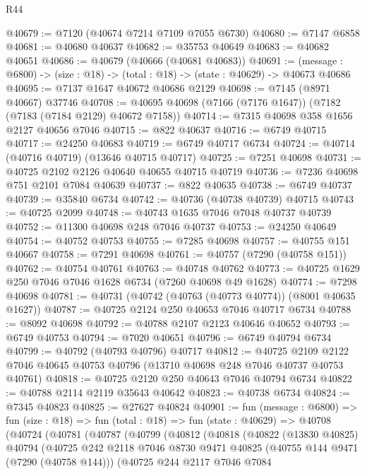 \begin{lexlean}{R44}
\begin{coremodule}
{@40679 := @7120 (@40674 @7214 @7109 @7055 @6730)
@40680 := @7147 @6858
@40681 := @40680 @40637
@40682 := @35753 @40649
@40683 := @40682 @40651
@40686 := @40679 (@40666 (@40681 @40683))
@40691 := (message : @6800) -> (size : @18) -> (total : @18) -> (state : @40629) -> @40673 @40686
@40695 := @7137 @1647 @40672 @40686 @2129
@40698 := @7145 (@8971 @40667) @37746
@40708 := @40695 @40698 (@7166 (@7176 @1647)) (@7182 (@7183 (@7184 @2129) @40672 @7158))
@40714 := @7315 @40698 @358 @1656 @2127 @40656 @7046
@40715 := @822 @40637
@40716 := @6749 @40715
@40717 := @24250 @40683
@40719 := @6749 @40717 @6734
@40724 := @40714 (@40716 @40719) (@13646 @40715 @40717)
@40725 := @7251 @40698
@40731 := @40725 @2102 @2126 @40640 @40655 @40715 @40719
@40736 := @7236 @40698 @751 @2101 @7084 @40639
@40737 := @822 @40635
@40738 := @6749 @40737
@40739 := @35840 @6734
@40742 := @40736 (@40738 @40739) @40715
@40743 := @40725 @2099
@40748 := @40743 @1635 @7046 @7048 @40737 @40739
@40752 := @11300 @40698 @248 @7046 @40737
@40753 := @24250 @40649
@40754 := @40752 @40753
@40755 := @7285 @40698
@40757 := @40755 @151 @40667
@40758 := @7291 @40698
@40761 := @40757 (@7290 (@40758 @151))
@40762 := @40754 @40761
@40763 := @40748 @40762
@40773 := @40725 @1629 @250 @7046 @7046 @1628 @6734 (@7260 @40698 @49 @1628)
@40774 := @7298 @40698
@40781 := @40731 (@40742 (@40763 (@40773 @40774)) (@8001 @40635 @1627))
@40787 := @40725 @2124 @250 @40653 @7046 @40717 @6734
@40788 := @8092 @40698
@40792 := @40788 @2107 @2123 @40646 @40652
@40793 := @6749 @40753
@40794 := @7020 @40651
@40796 := @6749 @40794 @6734
@40799 := @40792 (@40793 @40796) @40717
@40812 := @40725
    @2109
    @2122
    @7046
    @40645
    @40753
    @40796
    (@13710 @40698 @248 @7046 @40737 @40753 @40761)
@40818 := @40725 @2120 @250 @40643 @7046 @40794 @6734
@40822 := @40788 @2114 @2119 @35643 @40642
@40823 := @40738 @6734
@40824 := @7345 @40823
@40825 := @27627 @40824
@40901 := fun (message : @6800) =>
  fun (size : @18) =>
  fun (total : @18) =>
  fun (state : @40629) =>
  @40708
    (@40724
      (@40781
        (@40787
          (@40799
            (@40812
              (@40818
                (@40822
                  (@13830 @40825)
                  @40794
                  (@40725
                    @242
                    @2118
                    @7046
                    @8730
                    @9471
                    @40825
                    (@40755 @144 @9471 (@7290 (@40758 @144)))
                    (@40725
                      @244
                      @2117
                      @7046
                      @7084
}
\end{coremodule}
\end{lexlean}

